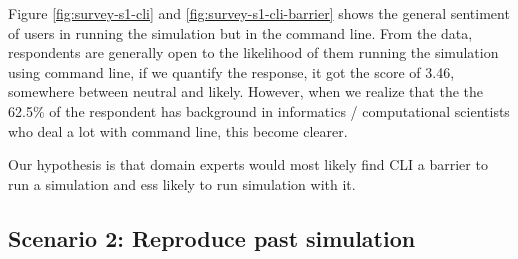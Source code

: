 \vspace{0.5cm}

Figure \ref{fig:survey-s1-cli} and \ref{fig:survey-s1-cli-barrier} shows the general sentiment of users in running the simulation but in the command line. From the data, respondents are generally open to the likelihood of them running the simulation using command line, if we quantify the response, it got the score of 3.46, somewhere between neutral and likely. However, when we realize that the the 62.5\% of the respondent has background in informatics / computational scientists who deal a lot with command line, this become clearer.

Our hypothesis is that domain experts would most likely find CLI a barrier to run a simulation and ess likely to run simulation with it.



\subsection{Scenario 2: Reproduce past simulation}

\vspace{0.5cm}

\noindent%
\begin{minipage}{\linewidth}%
 \label{fig:survey-s2-usability}%
\end{minipage}

\vspace{0.5cm}

